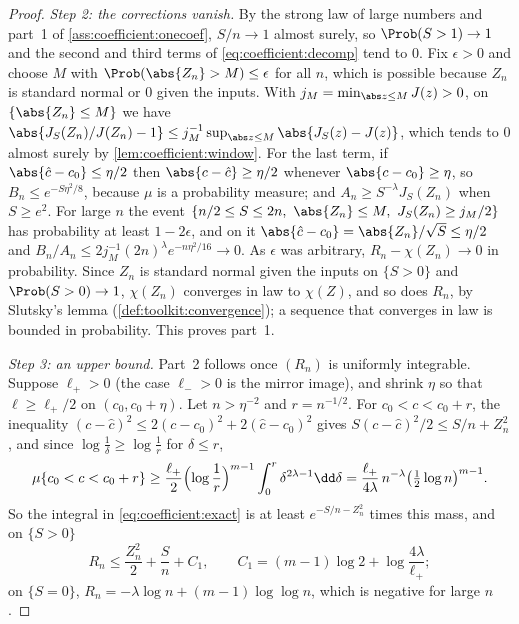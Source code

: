 \begin{refsection}
\begin{proof}
\emph{Step 2: the corrections vanish.} By the strong law of large numbers and part~1 of \cref{ass:coefficient:onecoef}, $S/n\to1$ almost surely, so $\Prob(S>1)\to1$ and the second and third terms of \eqref{eq:coefficient:decomp} tend to $0$. Fix $\epsilon>0$ and choose $M$ with $\Prob(\abs{Z_n}>M)\le\epsilon$ for all $n$, which is possible because $Z_n$ is standard normal or $0$ given the inputs. With $j_M=\min_{\abs z\le M}J(z)>0$, on $\{\abs{Z_n}\le M\}$ we have $\abs{J_S(Z_n)/J(Z_n)-1}\le j_M^{-1}\sup_{\abs z\le M}\abs{J_S(z)-J(z)}$, which tends to $0$ almost surely by \cref{lem:coefficient:window}. For the last term, if $\abs{\hat c-c_0}\le\eta/2$ then $\abs{c-\hat c}\ge\eta/2$ whenever $\abs{c-c_0}\ge\eta$, so $B_n\le e^{-S\eta^2/8}$, because $\mu$ is a probability measure; and $A_n\ge S^{-\lambda}J_S(Z_n)$ when $S\ge e^2$. For large $n$ the event $\{n/2\le S\le2n,\ \abs{Z_n}\le M,\ J_S(Z_n)\ge j_M/2\}$ has probability at least $1-2\epsilon$, and on it $\abs{\hat c-c_0}=\abs{Z_n}/\sqrt S\le\eta/2$ and $B_n/A_n\le2j_M^{-1}(2n)^\lambda e^{-n\eta^2/16}\to0$. As $\epsilon$ was arbitrary, $R_n-\chi(Z_n)\to0$ in probability. Since $Z_n$ is standard normal given the inputs on $\{S>0\}$ and $\Prob(S>0)\to1$, $\chi(Z_n)$ converges in law to $\chi(Z)$, and so does $R_n$, by Slutsky's lemma (\cref{def:toolkit:convergence}); a sequence that converges in law is bounded in probability. This proves part~1.

\emph{Step 3: an upper bound.} Part~2 follows once $(R_n)$ is uniformly integrable. Suppose $\ell_+>0$ (the case $\ell_->0$ is the mirror image), and shrink $\eta$ so that $\ell\ge\ell_+/2$ on $(c_0,c_0+\eta)$. Let $n>\eta^{-2}$ and $r=n^{-1/2}$. For $c_0<c<c_0+r$, the inequality $(c-\hat c)^2\le2(c-c_0)^2+2(\hat c-c_0)^2$ gives $S(c-\hat c)^2/2\le S/n+Z_n^2$, and since $\log\frac1\delta\ge\log\frac1r$ for $\delta\le r$,
\[
\mu\{c_0<c<c_0+r\}\ge\frac{\ell_+}2\Bigl(\log\frac1r\Bigr)^{m-1}\int_0^r\delta^{2\lambda-1}\dd\delta=\frac{\ell_+}{4\lambda}\,n^{-\lambda}\bigl(\tfrac12\log n\bigr)^{m-1}.
\]
So the integral in \eqref{eq:coefficient:exact} is at least $e^{-S/n-Z_n^2}$ times this mass, and on $\{S>0\}$
\begin{equation}\label{eq:coefficient:upper}
R_n\le\frac{Z_n^2}2+\frac Sn+C_1,\qquad C_1=(m-1)\log2+\log\frac{4\lambda}{\ell_+};
\end{equation}
on $\{S=0\}$, $R_n=-\lambda\log n+(m-1)\log\log n$, which is negative for large $n$.


\end{proof}
\end{refsection}
